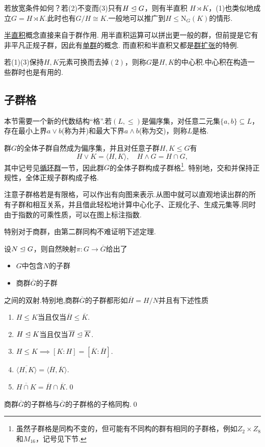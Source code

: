 \begin{remark}
	若放宽条件如何？若(2)不变而(3)只有$H\trianglelefteq G$，则有{\heiti 半直积} $H\rtimes K$，(1)也类似地成立$G=H\rtimes K$.此时也有$G/H\cong K$.一般地可以推广到$H\le\mathrm{N}_G(K)$的情形.

	\hyperlink{text:Semidirect}{半直积}概念直接来自于群作用.
	用半直积运算可以拼出更一般的群，但前提是它有非平凡正规子群，因此有\hyperlink{text:Simple}{单群}的概念.
	而直积和半直积又都是\hyperref[subsec:GroupExtension]{群扩张}的特例.

	若(1)(3)保持$H,K$元素可换而去掉$(2)$，则称$G$是$H,K$的{\heiti 中心积}.中心积在构造一些群时也是有用的.
\end{remark}
\subsection{子群格}
本节需要一个新的代数结构“格”.若$(L,\le)$是偏序集，对任意二元集$\{a,b\}\subseteq L$，存在最小上界$a\vee b$(称为{\heiti 并})和最大下界$a\wedge b$(称为{\heiti 交})，则称$L$是{\heiti 格}.

群$G$的全体子群自然成为偏序集，并且对任意子群$H,K\le G$有
\[
	H\vee K=\langle H,K\rangle ,\quad H\wedge G=H\cap G,
\]
其中记号见\hyperref[subsec:cyclic]{循环群}一节，因此群$G$的全体子群构成{\heiti 子群格}\footnote{虽然子群格是同构不变的，但可能有不同构的群有相同的子群格，例如$Z_2\times Z_8$和$M_{16}$，记号见下节.}.
特别地，交和并保持正规性，全体正规子群构成子格.

注意子群格若是有限格，可以作出有向图来表示.从图中就可以直观地读出群的所有子群和相互关系，并且借此轻松地计算中心化子、正规化子、生成元集等.同时由于指数的可乘性质，可以在图上标注指数.

特别对于商群，由第二群同构不难证明下述定理.
\begin{thm}[(子群格同构)]
	设$N\trianglelefteq G$，则自然映射$\pi\colon G\to\overline{G}$给出了\hypertarget{thm:LatticeIso}{}
	\begin{itemize}
		\item $G$中包含$N$的子群
		\item 商群$\overline{G}$的子群
	\end{itemize}
	之间的双射.特别地,商群$\overline{G}$的子群都形如$\overline{H}=H/N$并且有下述性质
	\begin{enumerate}
		\item $H\le K$当且仅当$\overline{H}\le\overline{K}$.
		\item $H\trianglelefteq K$当且仅当$\overline{H}\trianglelefteq\overline{K}$.
		\item $H\le K\implies[K:H]=[\overline{K}:\overline{H}]$.
		\item $\overline{\langle H,K\rangle }=\langle \overline{H},\overline{K}\rangle $.
		\item $\overline{H\cap K}=\overline{H}\cap\overline{K}$.\qed
	\end{enumerate}
\end{thm}
\begin{cor*}
	商群$\overline{G}$的子群格与$\overline{G}$的子群格的子格同构.\qed
\end{cor*}

